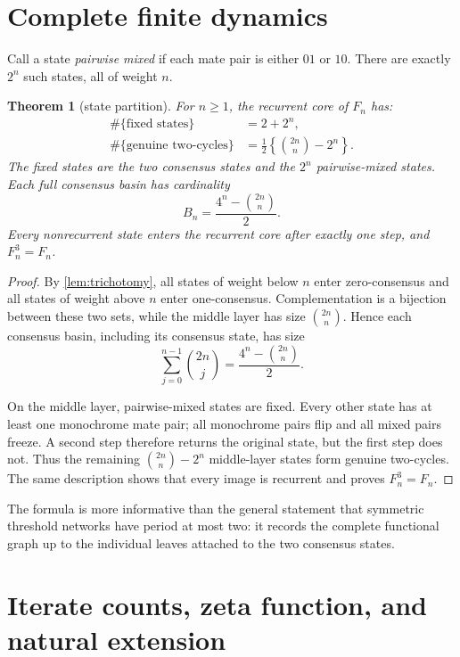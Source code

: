 \documentclass[11pt,a4paper]{amsart}
\newtheorem{theorem}{Theorem}[section]
\theoremstyle{definition}
\theoremstyle{remark}
\begin{document}
\section{Complete finite dynamics}

Call a state \emph{pairwise mixed} if each mate pair is either $01$ or
$10$.  There are exactly $2^n$ such states, all of weight $n$.

\begin{theorem}[state partition]\label{thm:partition}
For $n\geq1$, the recurrent core of $F_n$ has:
\begin{align*}
 \#\{\text{fixed states}\}&=2+2^n,\\
 \#\{\text{genuine two-cycles}\}
 &=\frac{1}{2}\left\{\binom{2n}{n}-2^n\right\}.
\end{align*}
The fixed states are the two consensus states and the $2^n$ pairwise-mixed
states.  Each full consensus basin has cardinality
\[
 B_n=\frac{4^n-\binom{2n}{n}}{2}.
\]
Every nonrecurrent state enters the recurrent core after exactly one step,
and $F_n^3=F_n$.
\end{theorem}

\begin{proof}
By \cref{lem:trichotomy}, all states of weight below $n$ enter zero-consensus
and all states of weight above $n$ enter one-consensus.  Complementation is a
bijection between these two sets, while the middle layer has size
$\binom{2n}{n}$.  Hence each consensus basin, including its consensus state,
has size
\[
 \sum_{j=0}^{n-1}\binom{2n}{j}
 =\frac{4^n-\binom{2n}{n}}2.
\]

On the middle layer, pairwise-mixed states are fixed.  Every other state has
at least one monochrome mate pair; all monochrome pairs flip and all mixed
pairs freeze.  A second step therefore returns the original state, but the
first step does not.  Thus the remaining
$\binom{2n}{n}-2^n$ middle-layer states form genuine two-cycles.  The same
description shows that every image is recurrent and proves $F_n^3=F_n$.
\end{proof}

The formula is more informative than the general statement that symmetric
threshold networks have period at most two: it records the complete
functional graph up to the individual leaves attached to the two consensus
states.

\section{Iterate counts, zeta function, and natural extension}
\end{document}
